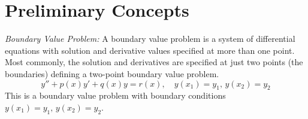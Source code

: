\documentclass[12pt,a4paper]{article}
\theoremstyle{remark}
\theoremstyle{definition}
\begin{document}
\begin{titlepage}
    
\end{titlepage}
\tableofcontents
\newpage
{}
\section{Preliminary Concepts}
\emph{Boundary Value Problem:} A boundary value problem is a system of differential equations with solution and derivative values specified at more than one point. Most commonly, the solution and derivatives are specified at just two points (the boundaries) defining a two-point boundary value problem.
\begin{equation}
    \label{eq:preSample}
    y''+p(x)y'+q(x)y=r(x),\quad y(x_1)=y_1,\,y(x_2)=y_2
\end{equation}
This is a boundary value problem with boundary conditions $ y(x_1)=y_1,\,y(x_2)=y_2 $.\\
\end{document}
